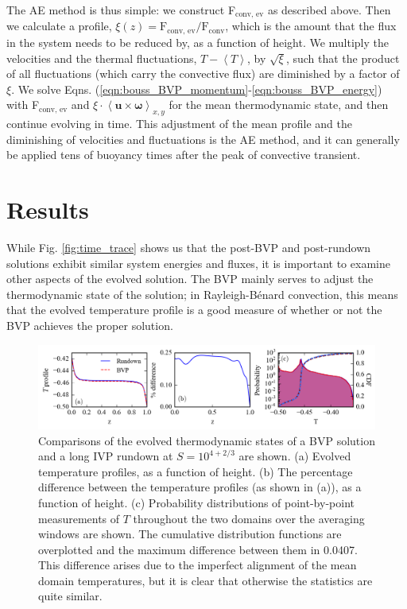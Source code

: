 \documentclass[aps, pre, onecolumn, nofootinbib, notitlepage, groupedaddress, amsfonts, amssymb, amsmath, longbibliography]{revtex4-1}
\newcommand{\angles}[1]{\ensuremath{\left\langle #1 \right\rangle}}
\newcommand{\RB}{Rayleigh-B\'{e}nard }
\begin{document}
The AE method is thus simple: we construct F$_{\text{conv, ev}}$ as described above.
Then we calculate a profile, 
$\xi(z) = \text{F}_{\text{conv, ev}}/\text{F}_{\text{conv}}$, which is the amount that the
flux in the system needs to be reduced by, as a function of height.
We multiply the velocities
and the thermal fluctuations, $T - \angles{T}$, by $\sqrt{\xi}$, such that the product of all fluctuations
(which carry the convective flux) are diminished by a factor of $\xi$.  We solve
Eqns. (\ref{eqn:bouss_BVP_momentum}-\ref{eqn:bouss_BVP_energy}) with F$_{\text{conv, ev}}$
and $\xi\cdot\angles{\bm{u}\times\bm{\omega}}_{x,y}$ for the mean thermodynamic state,
and then continue evolving in time.  This adjustment of the mean profile and the
diminishing of velocities and fluctuations is the AE method, and it can generally
be applied tens of buoyancy times after the peak of convective transient.

\section{Results}
\label{sec:results}
While Fig. \ref{fig:time_trace} shows us that the post-BVP and post-rundown solutions
exhibit similar system energies and fluxes, it is important to examine other aspects of
the evolved solution. The BVP mainly serves to adjust the thermodynamic state of the solution;
in \RB convection, this means that the evolved temperature profile is a good measure of whether
or not the BVP achieves the proper solution.

\begin{figure}[t]
\includegraphics[width=\textwidth]{./figs/temp_comparison.png}
\caption{Comparisons of the evolved thermodynamic states of a BVP solution and a long IVP rundown at
$S = 10^{4 + 2/3}$ are shown.  (a) Evolved temperature profiles, as a function of height.
(b) The percentage difference between the temperature profiles (as shown in (a)), as a function of height.
(c) Probability distributions of point-by-point measurements of $T$ throughout the two domains over the
averaging windows are shown.  The cumulative distribution functions are overplotted and the maximum
difference between them in 0.0407. This difference arises due to the imperfect alignment of the
mean domain temperatures, but it is clear that otherwise the statistics are quite similar.
\label{fig:temp_comparison} }
\end{figure}
\end{document}
